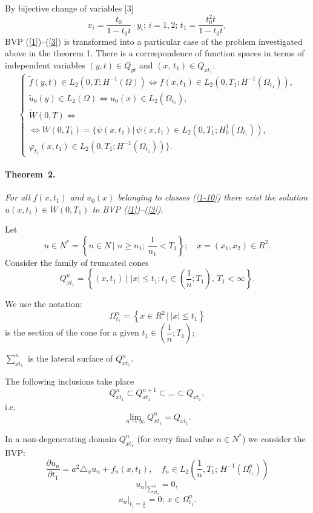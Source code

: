 By bijective change of variables [3]
$$
x_{i}=\frac{t_{0}}{1-t_{0}t}\cdot y_{i};\,i=1,2;\, t_{1}=\frac{t_{0}^{2}t}{1-t_{0}t},
$$
BVP (\ref{1})--(\ref{3}) is transformed into a particular case of the problem investigated above in the theorem 1.
There is a correspondence of function spaces in terms of independent variables $(y,t)\in Q_{yt}$ and $(x,\,t_{1})\in Q_{xt_{1}}$:
\begin{equation}\label{1-10}
\begin{cases}
\tilde{f}(y,t)\in L_{2}(0,T;H^{-1}(\Omega))\Leftrightarrow f(x,t_{1})\in L_{2}(0,T_{1};H^{-1}(\Omega_{t_{1}})), \\
\tilde{u}_{0}(y)\in L_{2}(\Omega)\Leftrightarrow u_{0}(x)\in L_{2}(\Omega_{t_{1}}), \\
\tilde{W}(0,T)\Leftrightarrow \\ \Leftrightarrow W(0,T_{1})=\{\psi(x,t_{1})|\,
\psi(x,t_{1})\in L_{2}(0,T_{1};H_{0}^{1}(\Omega_{t_{1}})), \\
\varphi_{t_{1}}(x,t_{1})\in L_{2}(0,T_{1};H^{-1}(\Omega_{t_{1}}))\}.
\end{cases}
\end{equation}
\paragraph{Theorem~2.}
{\it
For all $f(x,t_{1})$ and $u_{0}(x)$ belonging to classes (\ref{1-10}) there exist the solution $u(x, t_{1})\in W(0, T_{1})$ to BVP (\ref{1})--(\ref{3}).
}

Let
$$
n\in N^{*}=\left\{n\in N \,\Big|\,\, n\geq n_{1};\,\frac{1}{n_{1}}<T_{1}\right\}; \quad x=(x_{1}, x_{2})\in R^{2}. $$
Consider the family of truncated cones
$$
Q_{xt_{1}}^{n}=\left\{(x,t_{1})\,\Big|\, \,|x|\leq t_{1}; t_{1}\in \left(\frac{1}{n}; T_{1}\right),\,T_{1}<\infty \right\}.
$$

We use the notation:
$$
\Omega_{t_{1}}^{n}=\left\{x\in R^{2} \,\Big|\, |x|\leq t_{1}\right\}
$$
is the section of the cone for a given $t_{1}\in \left(\dfrac{1}{n}; T_{1}\right)$;

$\sum_{xt_{1}}^{n}$ is the lateral surface of $Q_{xt_{1}}^{n}$.

The following inclusions take place
$$
Q_{xt_{1}}^{n}\subset Q_{xt_{1}}^{n+1}\subset...\subset Q_{xt_{1}},
$$
i.e.
$$
\lim_{n\rightarrow \infty} Q_{xt_{1}}^{n}=Q_{xt_{1}}.
$$

In a non-degenerating domain $Q_{xt_{1}}^{n}$ (for every final value $n\in N^{*}$) we consider the BVP:
\begin{equation}\label{32}
\frac{\partial u_{n}}{\partial t_1}=a^{2}\triangle_x u_{n}+f_{n}(x,t_{1}),
\quad f_{n}\in L_{2}\left(\dfrac{1}{n},T_{1};\,H^{-1}(\Omega_{t_{1}}^{n})\right)
\end{equation}
\begin{equation}\label{33}
u_{n}|_{\sum_{xt_{1}}^{n}}=0,
\end{equation}
\begin{equation}\label{34}
u_{n}|_{t_{1}=\frac{1}{n}}=0;\, x\in\Omega_{t_{1}}^{n}.
\end{equation}

